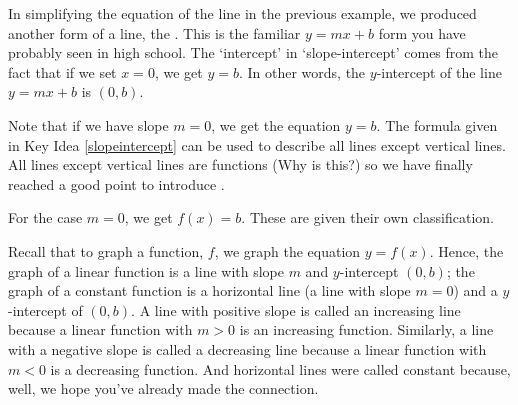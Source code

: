\medskip

In simplifying the equation of the line in the previous example, we produced another form of a line, the .  This is the familiar $y = mx + b$ form you have probably seen in high school. The `intercept' in `slope-intercept' comes from the fact that if we set $x=0$, we get $y = b$.  In other words, the $y$-intercept of the line $y = mx + b$ is $(0,b)$.

\smallskip


\smallskip

Note that if we have slope $m = 0$, we get the equation $y = b$.  The formula given in Key Idea \ref{slopeintercept} can be used to describe all lines except vertical lines.  All lines except vertical lines are functions (Why is this?) so we have finally reached a good point to introduce .

\smallskip


\smallskip

For the case $m=0$, we get $f(x) = b$.  These are given their own classification.

\smallskip


\smallskip

Recall that to graph a function, $f$, we graph the equation $y=f(x)$. Hence, the graph of a linear function is a line with slope $m$ and $y$-intercept $(0,b)$; the graph of a constant function is a horizontal line (a line with slope $m = 0$) and a $y$-intercept of $(0,b)$.  A line with positive slope is called an increasing line because a linear function with $m > 0$ is an increasing function.  Similarly, a line with a negative slope is called a decreasing line because a linear function with $m < 0$ is a decreasing function.  And horizontal lines were called constant because, well, we hope you've already made the connection.  

